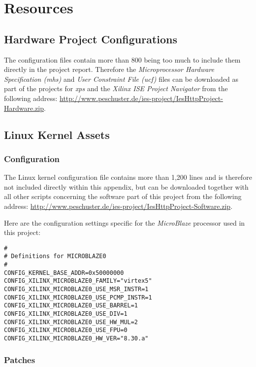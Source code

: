 \appendix 

\chapter{Resources}

\section{Hardware Project Configurations}

The configuration files contain more than 800 being too much to include them directly in the project report. Therefore the \textit{Microprocessor Hardware Specification (mhs)} and \textit{User Constraint File (ucf)} files can be downloaded as part of the projects for \textit{\gls{xps}} and the \textit{Xilinx ISE Project Navigator} from the following address: \url{http://www.peschuster.de/ies-project/IesHttpProject-Hardware.zip}.

\section{Linux Kernel Assets}

\subsection{Configuration}

The Linux kernel configuration file contains more than 1,200 lines and is therefore not included directly within this appendix, but can be downloaded together with all other scripts concerning the software part of this project from the following address: \url{http://www.peschuster.de/ies-project/IesHttpProject-Software.zip}.

Here are the configuration settings specific for the \textit{MicroBlaze} processor used in this project:

\begin{verbatim}
#
# Definitions for MICROBLAZE0
#
CONFIG_KERNEL_BASE_ADDR=0x50000000
CONFIG_XILINX_MICROBLAZE0_FAMILY="virtex5"
CONFIG_XILINX_MICROBLAZE0_USE_MSR_INSTR=1
CONFIG_XILINX_MICROBLAZE0_USE_PCMP_INSTR=1
CONFIG_XILINX_MICROBLAZE0_USE_BARREL=1
CONFIG_XILINX_MICROBLAZE0_USE_DIV=1
CONFIG_XILINX_MICROBLAZE0_USE_HW_MUL=2
CONFIG_XILINX_MICROBLAZE0_USE_FPU=0
CONFIG_XILINX_MICROBLAZE0_HW_VER="8.30.a"
\end{verbatim}

\subsection{Patches}
\label{subsec:pvr_patch}

